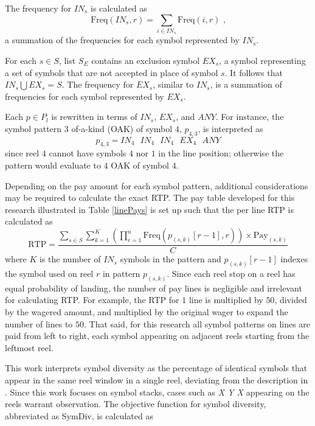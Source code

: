 \documentclass[conference]{IEEEtran}
\begin{document}
The frequency for $IN_s$ is calculated as 
\begin{equation}
\text{Freq}(IN_s,r) = \sum_{i \in IN_s} \text{Freq}(i,r)\text{ ,}
\end{equation}
a summation of the frequencies for each symbol represented by $IN_s$.
\par
For each $s \in S$, list $S_E$ contains an exclusion symbol $EX_s$, a symbol representing a set of symbols that are not accepted in place of symbol $s$.
It follows that $IN_s \bigcup EX_s = S$. 
The frequency for $EX_s$, similar to $IN_s$, is a summation of frequencies for each symbol represented by $EX_s$.
\par
Each $p\in P_l$ is rewritten in terms of $IN_s$, $EX_s$, and $ANY$.
For instance, the symbol pattern $3$ of-a-kind (OAK) of symbol $4$, $p_{4,3}$, is interpreted as
\begin{equation}
p_{4,3} = IN_4 \text{ } IN_4\text{ } IN_4 \text{ }EX_4\text{ } ANY
\end{equation}
since reel $4$ cannot have symbols $4$ nor $1$ in the line position; otherwise the pattern would evaluate to $4$ OAK of symbol $4$.
\par
Depending on the pay amount for each symbol pattern, additional considerations may be required to calculate the exact RTP.
The pay table developed for this research illustrated in Table \ref{linePays} is set up such that the per line RTP is calculated as
\begin{equation}
\text{RTP} = \frac{\sum_{s \in S}\sum_{k = 1}^{K}(\prod_{r = 1}^{n} \text{Freq}(p_{(s,k)}[r-1],r))\times \text{Pay}_{(s,k)}}{C}
\end{equation}
where $K$ is the number of $IN_s$ symbols in the pattern and $p_{(s,k)}[r-1]$ indexes the symbol used on reel $r$ in pattern $p_{(s,k)}$.
Since each reel stop on a reel has equal probability of landing, the number of pay lines is negligible and irrelevant for calculating RTP.
For example, the RTP for $1$ line is multiplied by $50$, divided by the wagered amount, and multiplied by the original wager to expand the number of lines to $50$.
That said, for this research all symbol patterns on lines are paid from left to right, each symbol appearing on adjacent reels starting from the leftmost reel.
\par
This work interprets symbol diversity as the percentage of identical symbols that appear in the same reel window in a single reel, deviating from the description in \cite{balabanovDDE}. Since this work focuses on symbol stacks, cases such as \textit{X Y X} appearing on the reels warrant observation. The objective function for symbol diversity, abbreviated as SymDiv, is calculated as
\end{document}

